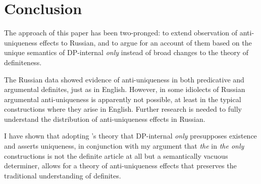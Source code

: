 \section{Conclusion \label{sec:conclusion}}
The approach of this paper has been two-pronged: to extend  observation of anti-uniqueness effects to Russian, and to argue for an account of them based on the unique semantics of DP-internal \textit{only} instead of broad changes to the theory of definiteness.

The Russian data showed evidence of anti-uniqueness in both predicative and argumental definites, just as in English. However, in some idiolects of Russian argumental anti-uniqueness is apparently not possible, at least in the typical constructions where they arise in English. Further research is needed to fully understand the distribution of anti-uniqueness effects in Russian.

I have shown that adopting \citeauthor{cb2015}'s theory that DP-internal \textit{only} presupposes existence and asserts uniqueness, in conjunction with my argument that \textit{the} in \textit{the only} constructions is not the definite article at all but a semantically vacuous determiner, allows for a theory of anti-uniqueness effects that preserves the traditional understanding of definites.